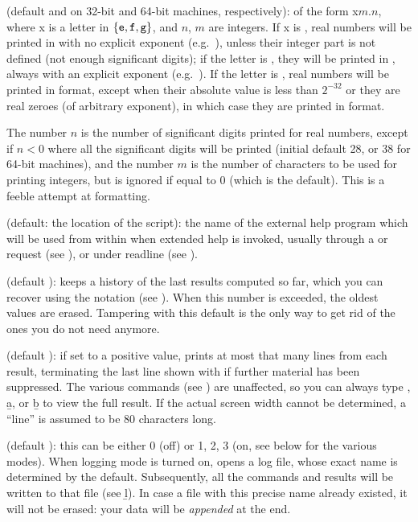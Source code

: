  (default  and  on 32-bit and
64-bit machines, respectively): of the form x$m.n$, where x is a letter in
$\{{\tt e},{\tt f},{\tt g}\}$, and $n$, $m$ are integers. If x is ,
real numbers will be printed in  with no
explicit exponent (e.g.~), unless their integer part is not
defined (not enough significant digits); if the letter is , they
will be printed in , always with an explicit
exponent (e.g.~). If the letter is , real numbers will
be printed in  format, except when their absolute value is less than
$2^{-32}$ or they are real zeroes (of arbitrary exponent), in which case
they are printed in  format.\label{se:format}

The number $n$ is the number of significant digits printed for real
numbers, except if $n<0$ where all the significant digits will be printed
(initial default 28, or 38 for 64-bit machines), and the number $m$ is the
number of characters to be used for printing integers, but is ignored if
equal to 0 (which is the default). This is a feeble attempt at formatting.

 (default: the location of the  script): the
name of the external help program which will be used from within  when
extended help is invoked, usually through a  or  request
(see ), or  under readline (see
).

 (default ):  keeps a history of the last
 results computed so far, which you can recover using the
\kbd{\%} notation (see ). When this number is exceeded,
the oldest values are erased. Tampering with this default is the only way to
get rid of the ones you do not need anymore.

 (default ): if set to a positive value,  prints at
most that many lines from each result, terminating the last line shown with
\kbd{[+++]} if further material has been suppressed. The various 
commands (see ) are unaffected, so you can always type
, \b{a}, or \b{b} to view the full result. If the actual
screen width cannot be determined, a ``line'' is assumed to be 80 characters
long.

 (default ): this can be either 0 (off) or 1, 2, 3
(on, see below for the various modes). When logging mode is turned on,
opens a log file, whose exact name is determined by the 
default. Subsequently, all the commands and results will be written to that
file (see \b{l}). In case a file with this precise name already existed, it
will not be erased: your data will be \emph{appended} at the end.

